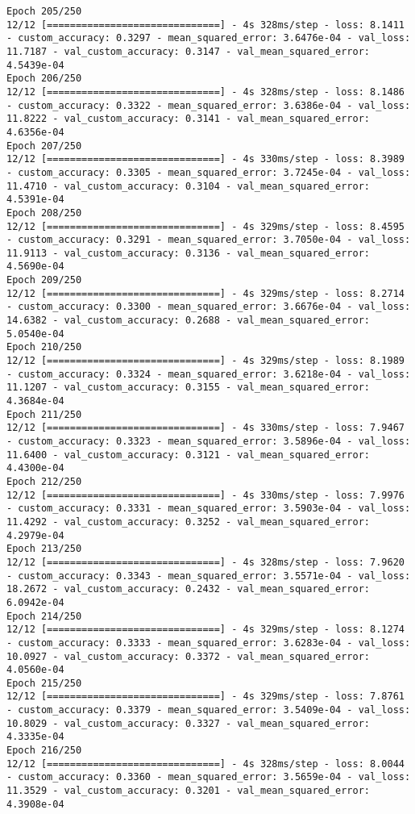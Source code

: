 \begin{lstlisting}
Epoch 205/250
12/12 [==============================] - 4s 328ms/step - loss: 8.1411 - custom_accuracy: 0.3297 - mean_squared_error: 3.6476e-04 - val_loss: 11.7187 - val_custom_accuracy: 0.3147 - val_mean_squared_error: 4.5439e-04
Epoch 206/250
12/12 [==============================] - 4s 328ms/step - loss: 8.1486 - custom_accuracy: 0.3322 - mean_squared_error: 3.6386e-04 - val_loss: 11.8222 - val_custom_accuracy: 0.3141 - val_mean_squared_error: 4.6356e-04
Epoch 207/250
12/12 [==============================] - 4s 330ms/step - loss: 8.3989 - custom_accuracy: 0.3305 - mean_squared_error: 3.7245e-04 - val_loss: 11.4710 - val_custom_accuracy: 0.3104 - val_mean_squared_error: 4.5391e-04
Epoch 208/250
12/12 [==============================] - 4s 329ms/step - loss: 8.4595 - custom_accuracy: 0.3291 - mean_squared_error: 3.7050e-04 - val_loss: 11.9113 - val_custom_accuracy: 0.3136 - val_mean_squared_error: 4.5690e-04
Epoch 209/250
12/12 [==============================] - 4s 329ms/step - loss: 8.2714 - custom_accuracy: 0.3300 - mean_squared_error: 3.6676e-04 - val_loss: 14.6382 - val_custom_accuracy: 0.2688 - val_mean_squared_error: 5.0540e-04
Epoch 210/250
12/12 [==============================] - 4s 329ms/step - loss: 8.1989 - custom_accuracy: 0.3324 - mean_squared_error: 3.6218e-04 - val_loss: 11.1207 - val_custom_accuracy: 0.3155 - val_mean_squared_error: 4.3684e-04
Epoch 211/250
12/12 [==============================] - 4s 330ms/step - loss: 7.9467 - custom_accuracy: 0.3323 - mean_squared_error: 3.5896e-04 - val_loss: 11.6400 - val_custom_accuracy: 0.3121 - val_mean_squared_error: 4.4300e-04
Epoch 212/250
12/12 [==============================] - 4s 330ms/step - loss: 7.9976 - custom_accuracy: 0.3331 - mean_squared_error: 3.5903e-04 - val_loss: 11.4292 - val_custom_accuracy: 0.3252 - val_mean_squared_error: 4.2979e-04
Epoch 213/250
12/12 [==============================] - 4s 328ms/step - loss: 7.9620 - custom_accuracy: 0.3343 - mean_squared_error: 3.5571e-04 - val_loss: 18.2672 - val_custom_accuracy: 0.2432 - val_mean_squared_error: 6.0942e-04
Epoch 214/250
12/12 [==============================] - 4s 329ms/step - loss: 8.1274 - custom_accuracy: 0.3333 - mean_squared_error: 3.6283e-04 - val_loss: 10.0927 - val_custom_accuracy: 0.3372 - val_mean_squared_error: 4.0560e-04
Epoch 215/250
12/12 [==============================] - 4s 329ms/step - loss: 7.8761 - custom_accuracy: 0.3379 - mean_squared_error: 3.5409e-04 - val_loss: 10.8029 - val_custom_accuracy: 0.3327 - val_mean_squared_error: 4.3335e-04
Epoch 216/250
12/12 [==============================] - 4s 328ms/step - loss: 8.0044 - custom_accuracy: 0.3360 - mean_squared_error: 3.5659e-04 - val_loss: 11.3529 - val_custom_accuracy: 0.3201 - val_mean_squared_error: 4.3908e-04

\end{lstlisting}

